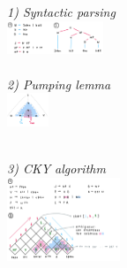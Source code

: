 \begin{multicols}{2}
\textit{1) Syntactic parsing}\\
\includegraphics[height=10mm]{inhalt/images/NLP/06_syntactic_parsing_1.png}
\\\\
\textit{2) Pumping lemma}\\
\includegraphics[height=10mm]{inhalt/images/NLP/06_syntactic_parsing_2.png}\\\\
\end{multicols}
\textit{3) CKY algorithm}\\
\includegraphics[height=25mm]{inhalt/images/NLP/06_syntactic_parsing_3.png}\\\\